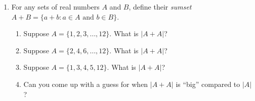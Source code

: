 \documentclass[12pt]{report}
\theoremstyle{definition}
\begin{document}
\begin{enumerate}
	\vfill

	\item For any sets of real numbers $A$ and $B$, define their \emph{sumset} $A+B = \{a+b: a\in A\text{ and }b\in B\}$.
	\begin{enumerate}
		\item Suppose $A = \{1, 2, 3, \ldots, 12\}$. What is $|A+A|$?
		\item Suppose $A = \{2, 4, 6, \ldots, 12\}$. What is $|A+A|$?
		\item Suppose $A = \{1, 3, 4, 5, 12\}$. What is $|A+A|$?
		\item Can you come up with a guess for when $|A+A|$ is ``big'' compared to $|A|$?
	\end{enumerate}

	\vfill
\end{enumerate}
\end{document}
